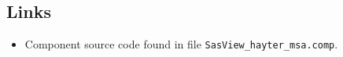 \subsection*{Links}
\begin{itemize}
  \item Component source code found in file \texttt{SasView\_hayter\_msa.comp}.
\end{itemize}
